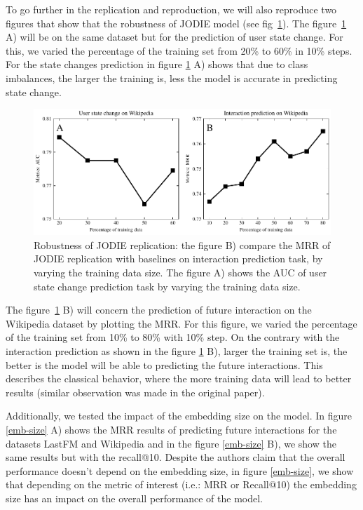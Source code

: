 To go further in the replication and reproduction, we will also reproduce two figures that show that the robustness of JODIE model (see fig~\ref{percentage-train}). The figure~\ref{percentage-train} A) will be on the same dataset but for the prediction of user state change. For this, we varied the percentage of the training set from 20\% to 60\% in 10\% steps. For the state changes prediction in figure \ref{percentage-train} A) shows that due to class imbalances, the larger the training is, less the model is accurate in predicting state change. 

\begin{figure}[htbp]
    \centering
    \includegraphics[width = \textwidth]{image/percentage_train.pdf}
    \caption{Robustness of JODIE replication: the figure B) compare the MRR of JODIE replication with baselines on interaction prediction task, by varying the training data size. The figure A) shows the AUC of user state change prediction task by varying the training data size.}
    \label{percentage-train}
\end{figure}


The figure~\ref{percentage-train} B) will concern the prediction of future interaction on the Wikipedia dataset by plotting the MRR. For this figure, we varied the percentage of the training set from 10\% to 80\% with 10\% step. 
On the contrary with the interaction prediction as shown in the figure \ref{percentage-train} B), larger the training set is, the better is the model will be able to predicting the future interactions. This describes the classical behavior, where the more training data will lead to better results (similar observation was made in the original paper).

Additionally, we tested the impact of the embedding size on the model. In figure \ref{emb-size} A)  shows the MRR results of predicting future interactions for the datasets LastFM and Wikipedia and in the figure \ref{emb-size} B), we show the same results but with the recall@10. Despite the authors claim that the overall performance doesn't depend on the embedding size, in figure \ref{emb-size},  we show that depending on the metric of interest (i.e.: MRR or Recall@10) the embedding size has an impact on the overall performance of the model. 

